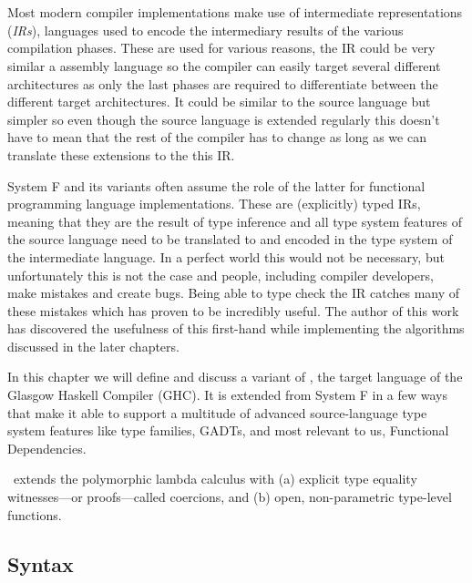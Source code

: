 \chapter{\systemfc}
\label{cha:system-fc}

Most modern compiler implementations make use of intermediate representations
(\textit{IRs}), languages used to encode the intermediary results of the
various compilation phases. These are used for various reasons, the IR could be
very similar a assembly language so the compiler can easily target several
different architectures as only the last phases are required to differentiate
between the different target architectures. It could be similar to the source
language but simpler so even though the source language is extended regularly
this doesn't have to mean that the rest of the compiler has to change as long as
we can translate these extensions to the this IR.

System F and its variants often assume the role of the latter for functional
programming language implementations. These are (explicitly) typed IRs, meaning
that they are the result of type inference and all type system features of the
source language need to be translated to and encoded in the type system of the
intermediate language. In a perfect world this would not be necessary, but
unfortunately this is not the case and people, including compiler developers,
make mistakes and create bugs. Being able to type check the IR catches many of
these mistakes which has proven to be incredibly useful. The author of this work
has discovered the usefulness of this first-hand while implementing the
algorithms discussed in the later chapters.

In this chapter we will define and discuss a variant of \systemfc, the    %
target language of the Glasgow Haskell Compiler (GHC). It is extended from System F in a few ways that
make it able to support a multitude of advanced source-language type
system features like type families, GADTs, and most relevant to us, Functional
Dependencies.

\systemfc~extends the polymorphic lambda calculus with (a) explicit type equality
witnesses---or proofs---called coercions, and (b) open, non-parametric type-level functions.

\section{Syntax}

